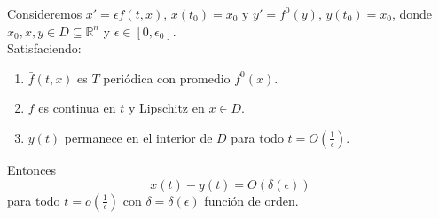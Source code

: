 \begin{theorem}
	Consideremos $x'=\epsilon f(t,x)$, $x(t_0)=x_0$ y $y'=f^0(y)$, $y(t_0)=x_0$,
	donde $x_0,x,y\in D\subseteq\mathbb{R}^n$ y $\epsilon\in[0,\epsilon_0]$.\\

	Satisfaciendo:
	\begin{enumerate}
		\item $\bar{f}(t,x)$ es $T$ periódica con promedio $f^0(x)$.
		\item $f$ es continua en $t$ y Lipschitz en $x\in D$.
		\item $y(t)$ permanece en el interior de $D$ para todo $t=O(\frac{1}{\epsilon})$.
	\end{enumerate}
	Entonces
	\[x(t)-y(t)=O(\delta(\epsilon))\]
	para todo $t=o(\frac{1}{\epsilon})$ con $\delta=\delta(\epsilon)$ función de orden.
\end{theorem}

